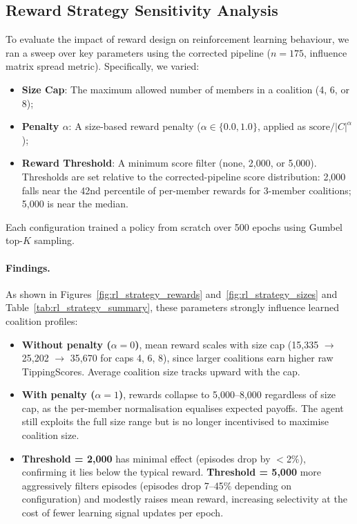 \documentclass[11pt]{article}
\begin{document}
\subsection{Reward Strategy Sensitivity Analysis}
\label{sec:rl_reward_strategies}

To evaluate the impact of reward design on reinforcement learning behaviour, we ran a sweep over key parameters using the corrected pipeline ($n = 175$, influence matrix spread metric). Specifically, we varied:
\begin{itemize}
	\item \textbf{Size Cap}: The maximum allowed number of members in a coalition (4, 6, or 8);
	\item \textbf{Penalty $\alpha$}: A size-based reward penalty ($\alpha \in \{0.0, 1.0\}$, applied as $\text{score} / |C|^{\alpha}$);
	\item \textbf{Reward Threshold}: A minimum score filter (none, 2{,}000, or 5{,}000). Thresholds are set relative to the corrected-pipeline score distribution: 2{,}000 falls near the 42nd percentile of per-member rewards for 3-member coalitions; 5{,}000 is near the median.
\end{itemize}

Each configuration trained a policy from scratch over 500 epochs using Gumbel top-$K$ sampling.

\paragraph{Findings.}
As shown in Figures~\ref{fig:rl_strategy_rewards} and~\ref{fig:rl_strategy_sizes} and Table~\ref{tab:rl_strategy_summary}, these parameters strongly influence learned coalition profiles:
\begin{itemize}
	\item \textbf{Without penalty ($\alpha = 0$)}, mean reward scales with size cap (15{,}335 $\to$ 25{,}202 $\to$ 35{,}670 for caps 4, 6, 8), since larger coalitions earn higher raw TippingScores. Average coalition size tracks upward with the cap.
	\item \textbf{With penalty ($\alpha = 1$)}, rewards collapse to 5{,}000--8{,}000 regardless of size cap, as the per-member normalisation equalises expected payoffs. The agent still exploits the full size range but is no longer incentivised to maximise coalition size.
	\item \textbf{Threshold = 2{,}000} has minimal effect (episodes drop by $<$2\%), confirming it lies below the typical reward. \textbf{Threshold = 5{,}000} more aggressively filters episodes (episodes drop 7--45\% depending on configuration) and modestly raises mean reward, increasing selectivity at the cost of fewer learning signal updates per epoch.
\end{itemize}
\end{document}
